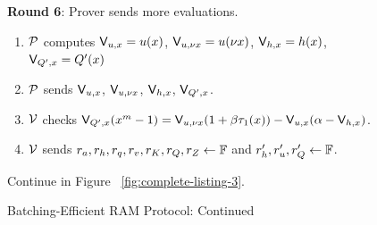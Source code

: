 \begin{figure}[t!]
\begin{mdframed}
        {\bf Round 6}: Prover sends more evaluations.
        \begin{enumerate}[leftmargin=1em, label=\arabic*.]
            \item $\prover$ computes $\val{x}{u}=u(x)$, $\val{\nu x}{u}=u(\nu x)$, $\val{x}{h}=h(x)$, $\val{x}{Q'}=Q'(x)$
            \item $\prover$ sends $\val{x}{u}$, $\val{\nu x}{u}$, $\val{x}{h}$, $\val{x}{Q'}$.
            \item $\verifier$ checks $\val{x}{Q'}(x^m-1)=\val{\nu x}{u}(1+\beta \tau_1(x))-\val{x}{u}(\alpha - \val{x}{h})$.
            \item $\verifier$ sends $r_a, r_h, r_q, r_v, r_K, r_Q, r_Z\gets \F$ and $r_h', r_u', r_Q'\gets \F$.
        \end{enumerate}

        \begin{center}
        Continue in Figure ~\ref{fig:complete-listing-3}.
        \end{center}


    \end{mdframed}
    \caption{Batching-Efficient RAM Protocol: Continued}
    \label{fig:complete-listing-2}
\end{figure}

